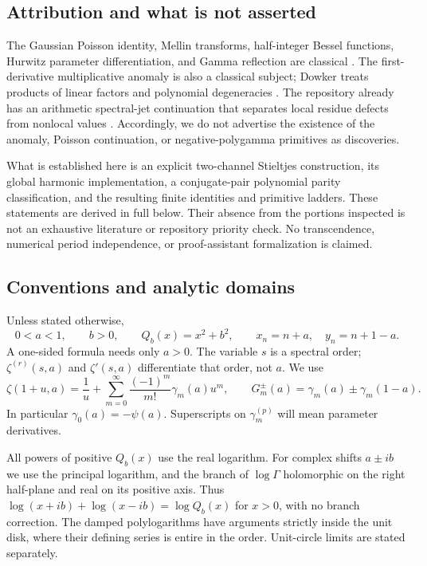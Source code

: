 \subsection{Attribution and what is not asserted}
The Gaussian Poisson identity, Mellin transforms, half-integer Bessel
functions, Hurwitz parameter differentiation, and Gamma reflection are
classical \cite{theta,bessel,halfK,hurwitz,gamma}. The first-derivative
multiplicative anomaly is also a classical subject; Dowker treats products
of linear factors and polynomial degeneracies \cite{dowker}. The repository
already has an arithmetic spectral-jet continuation that separates local
residue defects from nonlocal values \cite{arithmetic}. Accordingly, we do
not advertise the existence of the anomaly, Poisson continuation, or
negative-polygamma primitives as discoveries.

What is established here is an explicit two-channel Stieltjes construction,
its global harmonic implementation, a conjugate-pair polynomial parity
classification, and the resulting finite identities and primitive ladders.
These statements are derived in full below. Their absence from the portions
inspected is not an exhaustive literature or repository priority check.
No transcendence, numerical period independence, or proof-assistant
formalization is claimed.

\subsection{Conventions and analytic domains}\label{qspec:sec:conventions}
Unless stated otherwise,
\begin{equation}\label{qspec:eq:domain}
0<a<1,\qquad b>0,\qquad Q_b(x)=x^2+b^2,
\qquad x_n=n+a,\quad y_n=n+1-a.
\end{equation}
A one-sided formula needs only $a>0$. The variable $s$ is a spectral order;
$\zeta^{(r)}(s,a)$ and $\zeta'(s,a)$ differentiate that order, not $a$.
We use
\begin{equation}\label{qspec:eq:stieltjes-convention}
\zeta(1+u,a)=\frac1u+
\sum_{m=0}^{\infty}\frac{(-1)^m}{m!}\gamma_m(a)u^m,
\qquad G_m^\pm(a)=\gamma_m(a)\pm\gamma_m(1-a).
\end{equation}
In particular $\gamma_0(a)=-\psi(a)$. Superscripts on $\gamma_m^{(p)}$
will mean parameter derivatives.

All powers of positive $Q_b(x)$ use the real logarithm. For complex shifts
$a\pm ib$ we use the principal logarithm, and the branch of $\log\Gamma$
holomorphic on the right half-plane and real on its positive axis. Thus
$\log(x+ib)+\log(x-ib)=\log Q_b(x)$ for $x>0$, with no branch correction.
The damped polylogarithms have arguments strictly inside the unit disk,
where their defining series is entire in the order. Unit-circle limits
are stated separately.

